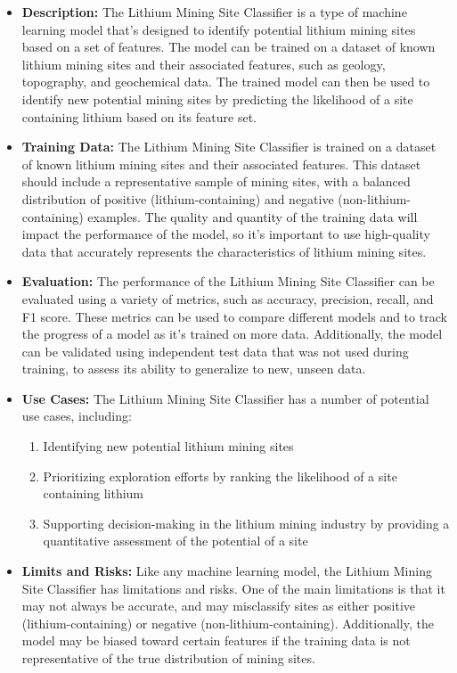 \begin{itemize} 
    \item \textbf{Description:} The Lithium Mining Site Classifier is a type of machine learning model that's designed to identify potential lithium mining sites based on a set of features. The model can be trained on a dataset of known lithium mining sites and their associated features, such as geology, topography, and geochemical data. The trained model can then be used to identify new potential mining sites by predicting the likelihood of a site containing lithium based on its feature set.
    \item \textbf{Training Data:} The Lithium Mining Site Classifier is trained on a dataset of known lithium mining sites and their associated features. This dataset should include a representative sample of mining sites, with a balanced distribution of positive (lithium-containing) and negative (non-lithium-containing) examples. The quality and quantity of the training data will impact the performance of the model, so it's important to use high-quality data that accurately represents the characteristics of lithium mining sites.
    \item \textbf{Evaluation:} The performance of the Lithium Mining Site Classifier can be evaluated using a variety of metrics, such as accuracy, precision, recall, and F1 score. These metrics can be used to compare different models and to track the progress of a model as it's trained on more data. Additionally, the model can be validated using independent test data that was not used during training, to assess its ability to generalize to new, unseen data.
    \item \textbf{Use Cases:} The Lithium Mining Site Classifier has a number of potential use cases, including:
    \begin{enumerate}
        \item Identifying new potential lithium mining sites
        \item Prioritizing exploration efforts by ranking the likelihood of a site containing lithium
        \item Supporting decision-making in the lithium mining industry by providing a quantitative assessment of the potential of a site
    \end{enumerate}
\item \textbf{Limits and Risks:} Like any machine learning model, the Lithium Mining Site Classifier has limitations and risks. One of the main limitations is that it may not always be accurate, and may misclassify sites as either positive (lithium-containing) or negative (non-lithium-containing). Additionally, the model may be biased toward certain features if the training data is not representative of the true distribution of mining sites.

\end{itemize}
